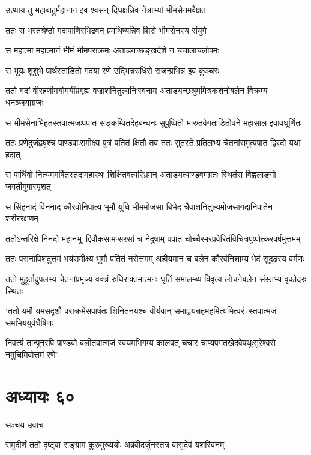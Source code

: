 \twolineshloka
{उत्थाय तु महाबाहुर्महानाग इव श्वसन्}
{दिधक्षन्निव नेत्राभ्यां भीमसेनमवैक्षत}


\twolineshloka
{ततः स भरतश्रेष्ठो गदापाणिरभिद्रवन्}
{प्रमथिष्यन्निव शिरो भीमसेनस्य संयुगे}


\twolineshloka
{स महात्मा महात्मानं भीमं भीमपराक्रमः}
{अताडयच्छङ्खदेशे न चचालाचलोपमः}


\twolineshloka
{स भूयः शुशुभे पार्थस्ताडितो गदया रणे}
{उद्भिन्नरुधिरो राजन्प्रभिन्न इव कुञ्चरः}


\twolineshloka
{ततो गदां वीरहणीमयोमयींप्रगृह्य वज्राशनितुल्यनिःस्वनाम्}
{अताडयच्छत्रुममित्रकर्शनोबलेन विक्रम्य धनञ्जयाग्रजः}


\twolineshloka
{स भीमसेनाभिहतस्तवात्मजःपपात सङ्कम्पितदेहबन्धनः}
{सुपुष्पितो मारुतवेगताडितोवने महासाल इवावघूर्णितः}


\twolineshloka
{ततः प्रणेदुर्जहृषुश्च पाण्डवाःसमीक्ष्य पुत्रं पतितं क्षितौ तव}
{ततः सुतस्ते प्रतिलभ्य चेतनांसमुत्पपात द्विरदो यथा हदात्}


\twolineshloka
{स पार्थिवो नित्यममर्षितस्तदामहारथः शिक्षितवत्परिभ्रमन्}
{अताडयत्पाण्डवमग्रतः स्थितंस विह्वलाङ्गो जगतीमुपास्पृशत्}


\twolineshloka
{स सिंहनादं विननाद कौरवोनिपात्य भूमौ युधि भीममोजसा}
{बिभेद चैवाशनितुल्यमोजसागदानिपातेन शरीररक्षणम्}


\twolineshloka
{ततोऽन्तरिक्षे निनदो महानभू--द्दिवौकसामप्सरसां च नेदुषाम्}
{पपात चोच्चैरमरप्रवेरितंविचित्रपुष्पोत्करवर्षमुत्तमम्}


\twolineshloka
{ततः परानाविशदुत्तमं भयंसमीक्ष्य भूमौ पतितं नरोत्तमम्}
{अहीयमानं च बलेन कौरवंनिशाम्य भेदं सुदृढस्य वर्मणः}


\twolineshloka
{ततो मुहूर्तादुपलभ्य चेतनांप्रमृज्य वक्त्रं रुधिराक्तमात्मनः}
{धृतिं समालम्ब्य विवृत्य लोचनेबलेन संस्तभ्य वृकोदरः स्थितः}


\twolineshloka
{`ततो यमौ यमसदृशौ पराक्रमेसपार्षतः शिनितनयश्च वीर्यवान्}
{समाह्वयन्नहमहमित्यभित्वरं--स्तवात्मजं समभिययुर्वधैषिणः}


\twolineshloka
{निवर्त्य तान्पुनरपि पाण्डवो बलीतवात्मजं स्वयमभिगम्य कालवत्}
{चचार चाप्यपगतखेदवेपथुःसुरेश्वरो नमुचिमिवोत्तमं रणे'}


\chapter{अध्यायः ६०}
\twolineshloka
{सञ्चय उवाच}
{}


\twolineshloka
{समुदीर्णं ततो दृष्ट्वा सङ्ग्रामं कुरुमुख्ययोः}
{अब्रवीदर्जुनस्तत्र वासुदेवं यशस्विनम्}


